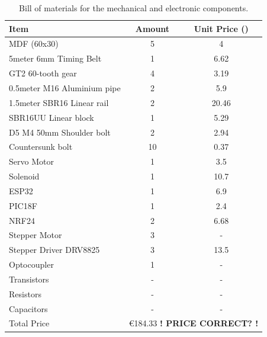 \begin{table}[h]
	\centering
	\caption{Bill of materials for the mechanical and electronic components.}
	\label{tab:bill-of-materials}
	\begin{tabular}{|l|c|c|}
		\hline
		Item & Amount & Unit Price (\texteuro) \\
		\hline\hline
		MDF (60x30) & 5 & 4 \\ 
		\hline
		5meter 6mm Timing Belt & 1 & 6.62\\
		\hline
		GT2 60-tooth gear & 4 & 3.19\\
		\hline
		0.5meter M16 Aluminium pipe & 2 & 5.9\\
		\hline
		1.5meter SBR16 Linear rail & 2 & 20.46\\
		\hline
		SBR16UU Linear block & 1 & 5.29\\
		\hline
		D5 M4 50mm Shoulder bolt & 2 & 2.94\\
		\hline
		Countersunk bolt & 10 & 0.37\\
		\hline
		Servo Motor & 1 & 3.5 \\
		\hline
		Solenoid & 1 & 10.7 \\ 
		\hline
		ESP32 & 1 & 6.9 \\
		\hline
		PIC18F & 1 & 2.4 \\
		\hline
		NRF24 & 2 & 6.68 \\
		\hline
		Stepper Motor & 3 & - \\
		\hline
		Stepper Driver DRV8825 & 3 & 13.5 \\
		\hline
		Optocoupler & 1 & - \\
		\hline
		Transistors & - & - \\
		\hline
		Resistors & - & - \\
		\hline
		Capacitors & - & - \\
		\hline\hline
		\multicolumn{1}{|l|}{Total Price} & \multicolumn{2}{c|}{€184.33 \textbf{! PRICE CORRECT? !}} \\
		\hline 
	\end{tabular}
\end{table}